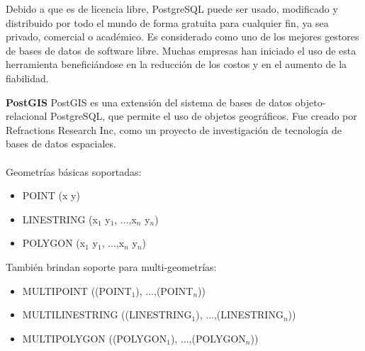 \documentclass[a4paper,12pt,oneside]{report}
\begin{document}
Debido a que es de licencia libre, PostgreSQL puede ser usado, modificado 
y distribuido por todo el mundo de forma gratuita para cualquier fin, ya sea privado, comercial o acad\'emico. Es considerado
 como uno de los mejores gestores de 
bases de datos de software libre. Muchas 
empresas han iniciado el uso de esta herramienta benefici\'andose en la reducci\'on de los costos y en el aumento de la fiabilidad.  

\textbf{PostGIS}
PostGIS es una extensi\'on del sistema de bases de datos objeto-relacional 
PostgreSQL, que permite el uso de objetos geogr\'aficos. Fue creado por 
Refractions Research Inc, como un proyecto de investigaci\'on de tecnolog\'ia de bases de datos espaciales.\\
\ \\
Geometr\'ias b\'asicas soportadas:

\begin{itemize}
\item POINT 	(x y)
\item LINESTRING (x$_1$ y$_1$, ...,x$_n$ y$_n$)
\item POLYGON (x$_1$ y$_1$, ...,x$_n$ y$_n$)
\end{itemize}

Tambi\'en brindan soporte para multi-geometr\'ias:

\begin{itemize}
\item MULTIPOINT ((POINT$_1$), ...,(POINT$_n$))
\item MULTILINESTRING ((LINESTRING$_1$), ...,(LINESTRING$_n$))
\item MULTIPOLYGON ((POLYGON$_1$), ...,(POLYGON$_n$))
\end{itemize}
\end{document}
